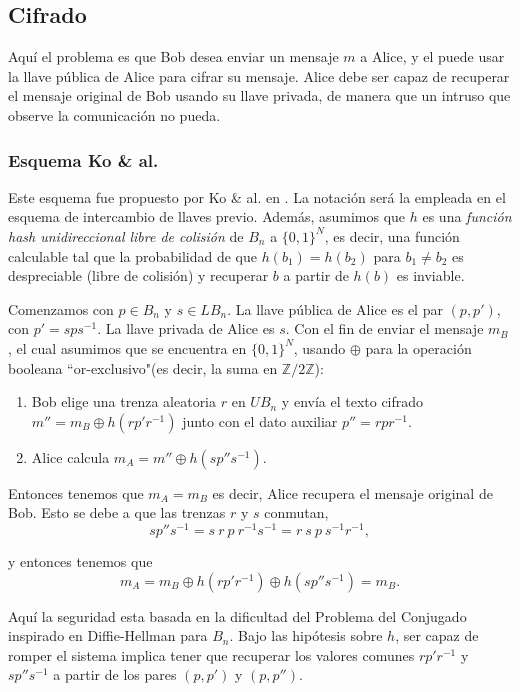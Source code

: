 \documentclass[12pt]{book}
\theoremstyle{definition}
\begin{document}
\subsection{Cifrado}
Aquí el problema es que Bob desea enviar un mensaje $m$ a Alice, y el puede usar la llave pública de Alice para cifrar su mensaje. Alice debe ser capaz de recuperar el mensaje original de Bob usando su llave privada, de manera que un intruso que observe la comunicación no pueda.

\subsubsection*{Esquema Ko \& al.}
Este esquema fue propuesto por Ko \& al. en \cite{Ko}. La notación será la empleada en el esquema de intercambio de llaves previo. Además, asumimos que $h$ es una \textit{función hash unidireccional libre de colisión} de $B_n$ a $\{0,1\}^N$, es decir, una función calculable tal que la probabilidad de que $h(b_1)=h(b_2)$ para $b_1\neq b_2$ es despreciable (libre de colisión) y recuperar $b$ a partir de $h(b)$ es inviable.

Comenzamos con $p\in B_n$ y $s\in LB_n$. La llave pública de Alice es el par $(p,p')$, con $p'=sps^{-1}$. La llave privada de Alice es $s$. Con el fin de enviar el mensaje $m_B$, el cual asumimos que se encuentra en $\{0,1\}^N$, usando $\oplus$ para la operación booleana ``or-exclusivo"(es decir, la suma en $\mathbb{Z}/2\mathbb{Z}$):

\begin{enumerate}
\item Bob elige una trenza aleatoria $r$ en $UB_n$ y envía el texto cifrado $m''=m_B\oplus h(rp'r^{-1})$ junto con el dato auxiliar $p''=rpr^{-1}$.
\item Alice calcula $m_A = m''\oplus h(sp''s^{-1})$. 

\end{enumerate}

Entonces tenemos que $m_A = m_B$ es decir, Alice recupera el mensaje original de Bob. Esto se debe a que las trenzas $r$ y $s$ conmutan,
$$sp''s^{-1}=s\ r\ p\ r^{-1}s^{-1}=r\ s\ p\ s^{-1}r^{-1},$$

y entonces tenemos que 
$$m_A = m_B\oplus h(rp'r^{-1})\oplus h(sp''s^{-1})=m_B.$$

Aquí la seguridad esta basada en la dificultad del Problema del Conjugado inspirado en Diffie-Hellman para $B_n$. Bajo las hipótesis sobre $h$, ser capaz de romper el sistema implica tener que recuperar los valores comunes $rp'r^{-1}$ y $sp''s^{-1}$ a partir de los pares $(p,p')$ y $(p,p'')$.
\end{document}
